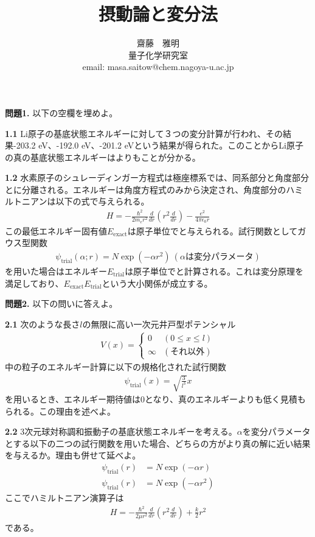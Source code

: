 \documentclass[11pt,pra,aps]{revtex4}
\newcommand{\boxz}[1]{\boxed{\phantom{\text{#1}}}}
\begin{document}
\title{摂動論と変分法}
\author{齋藤　雅明 \\ 量子化学研究室 \\ email: masa.saitow@chem.nagoya-u.ac.jp}

\maketitle

\noindent
{\bf 問題1.} 以下の空欄を埋めよ。

\noindent
{\bf 1.1} Li原子の基底状態エネルギーに対して３つの変分計算が行われ、その結果-203.2 eV、-192.0 eV、-201.2 eVという結果が得られた。このことからLi原子の真の基底状態エネルギーは\boxz{-203.2 eV}よりも\boxz{低い}ことが分かる。

\noindent
{\bf 1.2} 水素原子のシュレーディンガー方程式は極座標系では、同系部分と角度部分とに分離される。エネルギーは角度方程式のみから決定され、角度部分のハミルトニアンは以下の式で与えられる。
\begin{align}
  H = -\frac{\hbar^2}{2m_e r^2}\frac{d}{dr}\left(r^2\frac{d}{dr}\right)-\frac{e^2}{4\pi\epsilon_0 r}
\end{align}
この最低エネルギー固有値$E_\text{exact}$は原子単位で\boxz{-0.5}と与えられる。試行関数としてガウス型関数
\begin{align}
  \psi_\text{trial}(\alpha;r)=N\exp\left(-\alpha r^2\right) \ (\alpha\text{は変分パラメータ})
\end{align}
を用いた場合はエネルギー$E_\text{trial}$は原子単位で\boxz{}と計算される。これは変分原理を満足しており、$E_\text{exact}$\boxz{$\leq$}$E_\text{trial}$という大小関係が成立する。

\noindent
{\bf 問題2.} 以下の問いに答えよ。

\noindent
{\bf 2.1} 次のような長さ$l$の無限に高い一次元井戸型ポテンシャル
\begin{align}
  V(x)=\left\{
  \begin{array}{cc}
    0 & (0 \leq x \leq l) \\
    \infty & (\text{それ以外})
  \end{array}
  \right.
\end{align}
中の粒子のエネルギー計算に以下の規格化された試行関数
\begin{align}
  \psi_\text{trial}(x) = \sqrt{\frac{3}{l^3}}x
\end{align}
を用いるとき、エネルギー期待値は0となり、真のエネルギーよりも低く見積もられる。この理由を述べよ。

\noindent
{\bf 2.2} 3次元球対称調和振動子の基底状態エネルギーを考える。$\alpha$を変分パラメータとする以下の二つの試行関数を用いた場合、どちらの方がより真の解に近い結果を与えるか。理由も併せて延べよ。
\begin{align}
  \psi_\text{trial}(r)&=N\exp\left(-\alpha r\right) \\
  \psi_\text{trial}(r)&=N\exp\left(-\alpha r^2\right)
\end{align}
ここでハミルトニアン演算子は
\begin{align}
  H=-\frac{\hbar^2}{2\mu r^2}\frac{d}{dr}\left(r^2\frac{d}{dr}\right)+\frac{k}{2}r^2
\end{align}
である。
\end{document}
